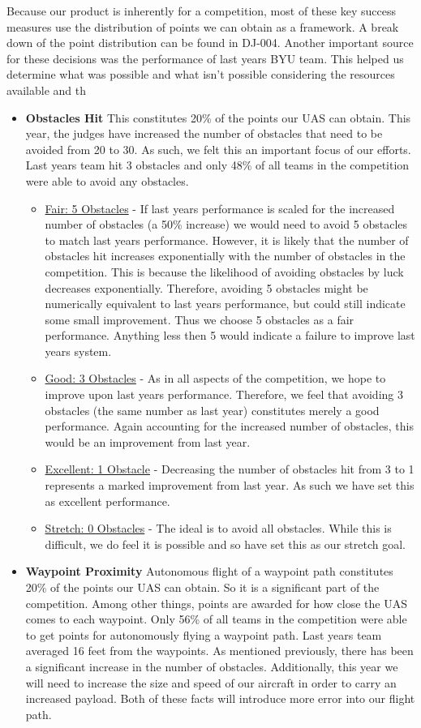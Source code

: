 \documentclass[]{auvsi_doc}
\begin{document}
Because our product is inherently for a competition, most of these key success measures use the distribution of points we can obtain as a framework. A break down of the point distribution can be found in DJ-004. Another important source for these decisions was the performance of last years BYU team. This helped us determine what was possible and what isn't possible considering the resources available and th

\begin{itemize}
\item \textbf{Obstacles Hit} This constitutes 20\% of the points our UAS can obtain. This year, the judges have increased the number of obstacles that need to be avoided from 20 to 30. As such, we felt this an important focus of our efforts. Last years team hit 3 obstacles and only 48\% of all teams in the competition were able to avoid any obstacles. 
	\begin{itemize}
	\item  \underline{Fair: 5 Obstacles} -  If last years performance is scaled for the increased number of obstacles (a 50\% increase) we would need to avoid 5 obstacles to match last years performance. However, it is likely that the number of obstacles hit increases exponentially with the number of obstacles in the competition. This is because the likelihood of avoiding obstacles by luck decreases exponentially. Therefore, avoiding 5 obstacles might be numerically equivalent to last years performance, but could still indicate some small improvement. Thus we choose 5 obstacles as a fair performance. Anything less then 5 would indicate a failure to improve last years system.
	\item \underline{Good: 3 Obstacles} -  As in all aspects of the competition, we hope to improve upon last years performance. Therefore, we feel that avoiding 3 obstacles (the same number as last year) constitutes merely a good performance. Again accounting for the increased number of obstacles, this would be an improvement from last year.
	\item \underline{Excellent: 1 Obstacle} -  Decreasing the number of obstacles hit from 3 to 1 represents a marked improvement from last year. As such we have set this as excellent performance.
	\item \underline{Stretch: 0 Obstacles} - The ideal is to avoid all obstacles. While this is difficult, we do feel it is possible and so have set this as our stretch goal.
	\end{itemize}
\item \textbf{Waypoint Proximity} Autonomous flight of a waypoint path constitutes 20\% of the points our UAS can obtain. So it is a significant part of the competition. Among other things, points are awarded for how close the UAS comes to each waypoint. Only 56\% of all teams in the competition were able to get points for autonomously flying a waypoint path. Last years team averaged 16 feet from the waypoints.  As mentioned previously, there has been a significant increase in the number of obstacles. Additionally, this year we will need to increase the size and speed of our aircraft in order to carry an increased payload. Both of these facts will introduce more error into our flight path. 

\end{itemize}
\end{document}
